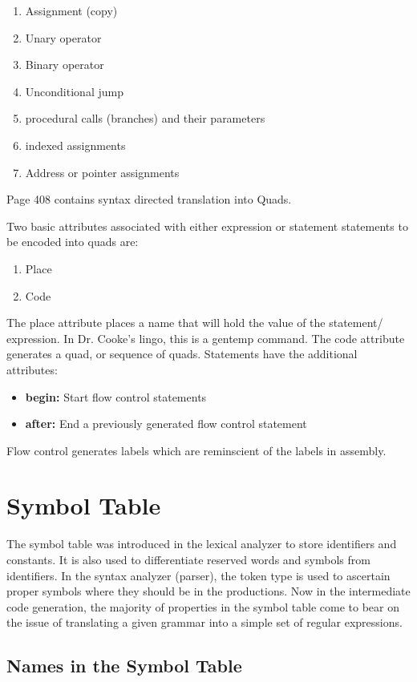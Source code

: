 \documentclass[11pt]{article}
\begin{document}
 \begin{enumerate}
\item Assignment (copy)
\item Unary operator
\item Binary operator
\item Unconditional jump
\item procedural calls (branches) and their parameters
\item indexed assignments
\item Address or pointer assignments
\end{enumerate}

Page 408 contains syntax directed translation into Quads.

Two basic attributes associated with either expression or statement statements to be encoded into quads are:
\begin{enumerate}
\item Place 
\item Code
\end{enumerate}
 The place attribute places a name that will hold the value of the statement/ expression.  In Dr. Cooke's lingo, this is a gentemp command.    The code attribute generates a quad, or sequence of quads.  
Statements have the additional attributes:
\begin{itemize}
\item \textbf{begin:}  Start flow control statements
\item \textbf{after:}   End a previously generated flow control statement
\end{itemize}
Flow control generates labels which are reminscient of the labels in assembly.  

\section{Symbol Table}
The symbol table was introduced in the lexical analyzer to store identifiers and constants.  It is also used to differentiate reserved words and symbols from identifiers.    In the syntax analyzer (parser), the token type is used to ascertain proper symbols where they should be in the productions.  Now in the intermediate code generation, the majority of properties in the symbol table come to bear on the issue of translating a given grammar into a simple set of regular expressions.  



\subsection {Names in the Symbol Table}
\end{document}
